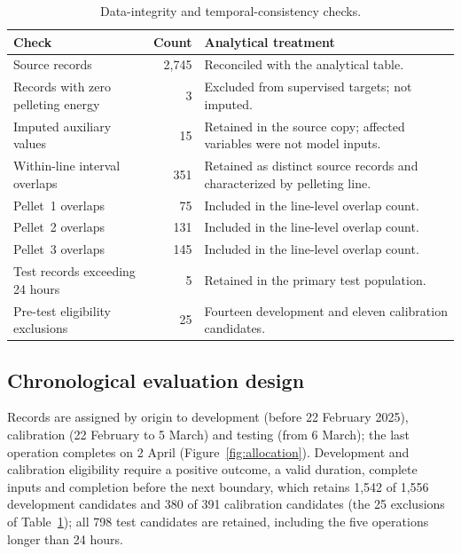 \begin{table}[!htbp]\centering\small
\caption{Data-integrity and temporal-consistency checks.}\label{tab:quality}
\begin{tabularx}{\linewidth}{@{}XrX@{}}\toprule
Check & Count & Analytical treatment \\\midrule
Source records & 2,745 & Reconciled with the analytical table. \\
Records with zero pelleting energy & 3 & Excluded from supervised targets; not imputed. \\
Imputed auxiliary values & 15 & Retained in the source copy; affected variables were not model inputs. \\
Within-line interval overlaps & 351 & Retained as distinct source records and characterized by pelleting line. \\
Pellet~1 overlaps & 75 & Included in the line-level overlap count. \\
Pellet~2 overlaps & 131 & Included in the line-level overlap count. \\
Pellet~3 overlaps & 145 & Included in the line-level overlap count. \\
Test records exceeding 24 hours & 5 & Retained in the primary test population. \\
Pre-test eligibility exclusions & 25 & Fourteen development and eleven calibration candidates. \\\bottomrule
\end{tabularx}
\end{table}

\subsection{Chronological evaluation design}
Records are assigned by origin to development (before 22 February 2025), calibration (22 February to 5 March) and testing (from 6 March); the last operation completes on 2 April (Figure~\ref{fig:allocation}). Development and calibration eligibility require a positive outcome, a valid duration, complete inputs and completion before the next boundary, which retains 1,542 of 1,556 development candidates and 380 of 391 calibration candidates (the 25 exclusions of Table~\ref{tab:quality}); all 798 test candidates are retained, including the five operations longer than 24 hours.


